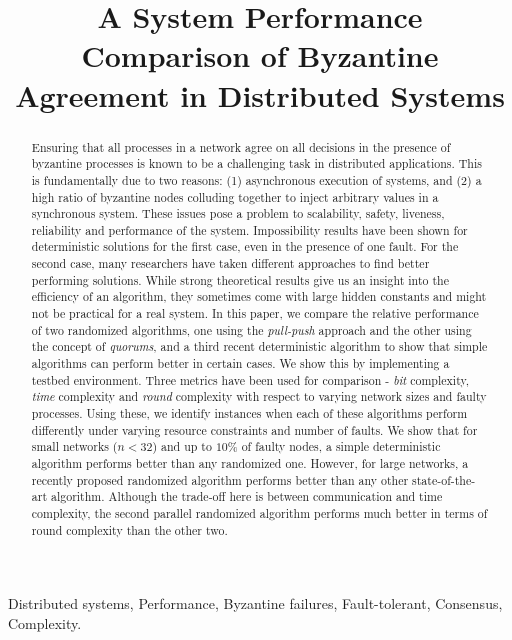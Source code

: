 \title{A System Performance Comparison of Byzantine Agreement in Distributed Systems}


%

\maketitle

\begin{abstract}

Ensuring that all processes in a network agree on all decisions in the
presence of byzantine processes is known to be a challenging task in
distributed applications. This is fundamentally due to two reasons: (1)
asynchronous execution of systems, and (2) a high ratio of byzantine
nodes colluding together to inject arbitrary values in a synchronous
system. These issues pose a problem to scalability, safety, liveness,
reliability and performance of the system. Impossibility results have
been shown for deterministic solutions for the first case, even in the
presence of one fault. For the second case, many researchers have taken
different approaches to find better performing solutions. While strong
theoretical results give us an insight into the efficiency of an
algorithm, they sometimes come with large hidden constants and might not
be practical for a real system. In this paper, we compare the relative
performance of two randomized algorithms, one using the {\em pull-push} approach
and the other using the concept of {\em quorums}, and a third recent
deterministic algorithm to show that simple algorithms can perform
better in certain cases. We show this by implementing a testbed
environment. Three metrics have been used for comparison - {\em bit}
complexity, {\em time} complexity and {\em round} complexity with respect to varying network sizes and
faulty processes. Using these, we identify instances when each of these
algorithms perform differently under varying resource constraints and
number of faults. We show that for small networks ($n<32$) and up to $10\%$ of faulty nodes, a simple deterministic algorithm performs better than any randomized one. However, for large networks, a recently proposed randomized algorithm performs better than any other state-of-the-art algorithm. Although the trade-off here is between communication and time complexity, the second parallel randomized algorithm performs much better in terms of round complexity than the other two. 

\end{abstract}

 Distributed systems, Performance, Byzantine failures, Fault-tolerant, Consensus, Complexity.
